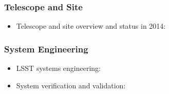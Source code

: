 \subsubsection{Telescope and Site}

\begin{itemize}
   \item Telescope and site overview and status in 2014:  \cite{2014SPIE.9145E..1AG}
\end{itemize}

\subsubsection{System Engineering}

\begin{itemize}
   \item LSST systems engineering: \cite{2014SPIE.9150E..0MC}
   \item System verification and validation: \cite{2014SPIE.9150E..0NS}
\end{itemize}
%


